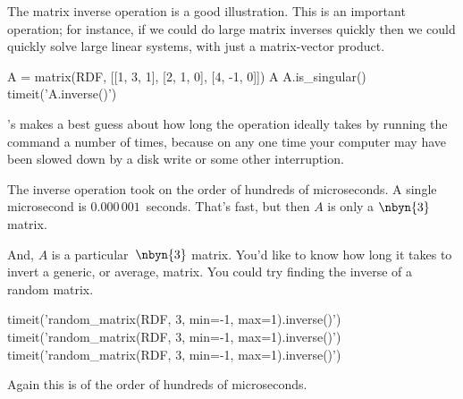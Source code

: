 The matrix inverse operation is a good illustration.
This is an important operation; for instance, if we could do large matrix 
inverses
quickly then we could quickly solve large linear systems, 
with just a matrix-vector product.
\begin{sageoutput}
A = matrix(RDF, [[1, 3, 1], [2, 1, 0], [4, -1, 0]])
A
A.is_singular()
timeit('A.inverse()')
\end{sageoutput}
\noindent
\Sage's  makes a best guess about how long
the operation ideally takes by running the command 
a number of times, because on any one time your
computer may have been slowed down by a 
disk write or some other interruption.

The inverse operation took on the order of hundreds of microseconds.
A single microsecond is 
$0.000\,001$~seconds.
That's fast, but then $A$ is only a $\nbyn{3}$ matrix.

And, $A$ is a particular~$\nbyn{3}$ matrix. 
You'd like to know
how long it takes to invert a generic, or average, matrix.
You could try finding the inverse of a random matrix.
\begin{sageoutput}
timeit('random_matrix(RDF, 3, min=-1, max=1).inverse()')
timeit('random_matrix(RDF, 3, min=-1, max=1).inverse()')
timeit('random_matrix(RDF, 3, min=-1, max=1).inverse()')
\end{sageoutput}
\noindent
Again this is of the order of hundreds of microseconds.

